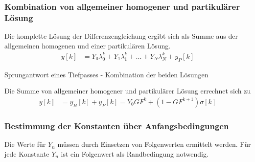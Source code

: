 \subsubsection{Kombination von allgemeiner homogener und partikulärer Lösung}\label{sec:kombination-von-allgemeiner-homogener-und-partikuluxe4rer-luxf6sung}

Die komplette Lösung der Differenzengleichung ergibt sich als Summe aus der allgemeinen homogenen und einer partikulären Lösung.
\begin{align}
y[ k] &= Y_{0}  \lambda_{0}^{k} + Y_{1}  \lambda_{1}^{k} + ... + Y_{N}  \lambda_{N}^{k} + y_{P}[ k] \label{eq:4.69}
\end{align}
\begin{example}{Sprungantwort eines Tiefpasses - Kombination der beiden Lösungen}
\label{example:beispiel-sprungantwort-eines-tiefpasses---kombination-der-beiden-luxf6sungen}

Die Summe von allgemeiner homogener und partikulärer Lösung errechnet sich zu
\begin{align*}
y[ k] &= y_{H}[ k] + y_{P}[ k] = Y_{0}  GF^{k} + \left( 1 - GF^{k + 1} \right)  \sigma[ k] 
\end{align*}
\end{example}

\subsubsection{Bestimmung der Konstanten über Anfangsbedingungen}\label{sec:bestimmung-der-konstanten-uxfcber-anfangsbedingungen}

Die Werte für \(Y_{n}\) müssen durch Einsetzen von Folgenwerten ermittelt werden. Für jede Konstante \(Y_{n}\) ist ein Folgenwert als Randbedingung notwendig.

